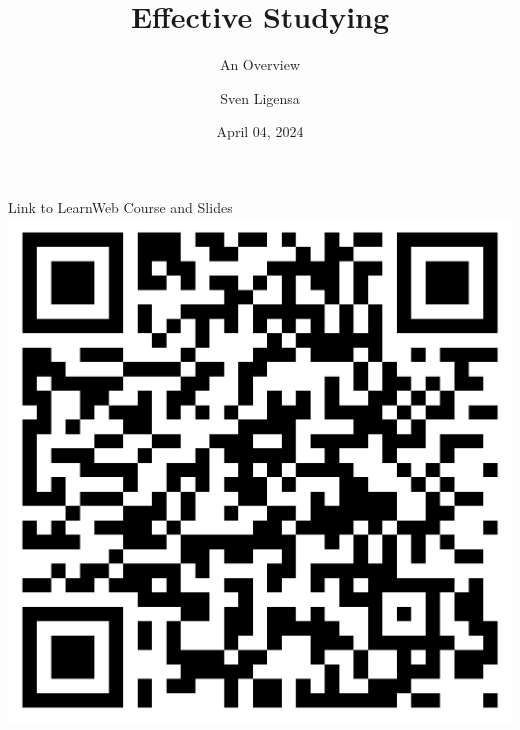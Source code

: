 \documentclass{ercisbeamer}
\title{Effective Studying}
\subtitle{An Overview}
\author{Sven Ligensa}
\institute{European Research Center for Information Systems (ERCIS)}
\date{April 04, 2024}
\begin{document}
\begin{frame}{Link to LearnWeb Course and Slides}
    \centering \includegraphics[height=.9\paperheight]{00_resources/qr_lw_course.png}
\end{frame}

\begin{frame}
    \begin{tbox}
        \titlepage
    \end{tbox}
\end{frame}
\setbgimage{}
\end{document}
